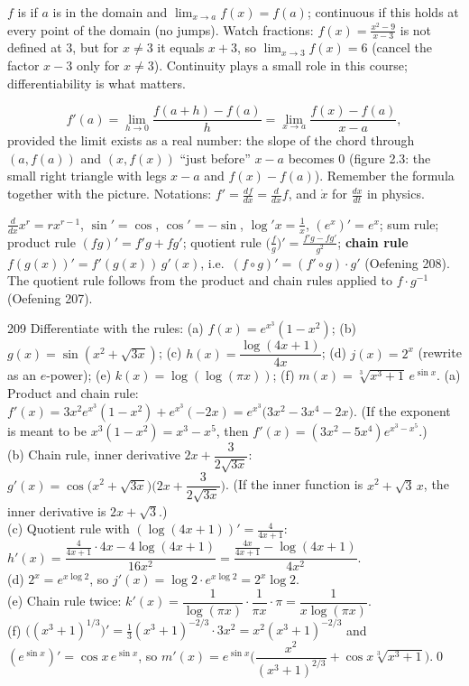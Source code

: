 \begin{key}
$f$ is  if $a$ is in the domain and $\lim_{x\to a}f(x)=f(a)$; continuous if this holds at every point of the domain (no jumps). Watch fractions: $f(x)=\frac{x^2-9}{x-3}$ is not defined at $3$, but for $x\ne3$ it equals $x+3$, so $\lim_{x\to3}f(x)=6$ (cancel the factor $x-3$ only for $x\ne3$). Continuity plays a small role in this course; differentiability is what matters.
\end{key}

\begin{key}
\[
f'(a)=\lim_{h\to0}\frac{f(a+h)-f(a)}h=\lim_{x\to a}\frac{f(x)-f(a)}{x-a},
\]
provided the limit exists as a real number: the slope of the chord through $(a,f(a))$ and $(x,f(x))$ ``just before'' $x-a$ becomes $0$ (figure 2.3: the small right triangle with legs $x-a$ and $f(x)-f(a)$). Remember the formula together with the picture. Notations: $f'=\frac{df}{dx}=\frac d{dx}f$, and $\dot x$ for $\frac{dx}{dt}$ in physics.
\end{key}
\begin{result}
$\frac d{dx}x^r=rx^{r-1}$, $\sin'=\cos$, $\cos'=-\sin$, $\log'x=\frac1x$, $(e^x)'=e^x$; sum rule; product rule $(fg)'=f'g+fg'$; quotient rule $\big(\frac fg\big)'=\frac{f'g-fg'}{g^2}$; \textbf{chain rule} $f(g(x))'=f'(g(x))\,g'(x)$, i.e.\ $(f\circ g)'=(f'\circ g)\cdot g'$ (Oefening 208). The quotient rule follows from the product and chain rules applied to $f\cdot g^{-1}$ (Oefening 207).
\end{result}

\begin{bookex}{209}
Differentiate with the rules: (a) $f(x)=e^{x^3}(1-x^2)$; (b) $g(x)=\sin(x^2+\sqrt{3x})$; (c) $h(x)=\dfrac{\log(4x+1)}{4x}$; (d) $j(x)=2^x$ (rewrite as an $e$-power); (e) $k(x)=\log(\log(\pi x))$; (f) $m(x)=\sqrt[3]{x^3+1}\,e^{\sin x}$.
\solution
(a) Product and chain rule: $f'(x)=3x^2e^{x^3}(1-x^2)+e^{x^3}(-2x)=e^{x^3}\big(3x^2-3x^4-2x\big)$. (If the exponent is meant to be $x^3(1-x^2)=x^3-x^5$, then $f'(x)=(3x^2-5x^4)e^{x^3-x^5}$.)\\
(b) Chain rule, inner derivative $2x+\dfrac3{2\sqrt{3x}}$: $g'(x)=\cos\big(x^2+\sqrt{3x}\big)\Big(2x+\dfrac3{2\sqrt{3x}}\Big)$. (If the inner function is $x^2+\sqrt3\,x$, the inner derivative is $2x+\sqrt3$.)\\
(c) Quotient rule with $(\log(4x+1))'=\frac4{4x+1}$: $h'(x)=\dfrac{\frac4{4x+1}\cdot4x-4\log(4x+1)}{16x^2}=\dfrac{\frac{4x}{4x+1}-\log(4x+1)}{4x^2}$.\\
(d) $2^x=e^{x\log2}$, so $j'(x)=\log2\cdot e^{x\log2}=2^x\log2$.\\
(e) Chain rule twice: $k'(x)=\dfrac1{\log(\pi x)}\cdot\dfrac1{\pi x}\cdot\pi=\dfrac1{x\log(\pi x)}$.\\
(f) $\big((x^3+1)^{1/3}\big)'=\frac13(x^3+1)^{-2/3}\cdot3x^2=x^2(x^3+1)^{-2/3}$ and $(e^{\sin x})'=\cos x\,e^{\sin x}$, so $m'(x)=e^{\sin x}\Big(\dfrac{x^2}{(x^3+1)^{2/3}}+\cos x\sqrt[3]{x^3+1}\Big)$.\qed
\end{bookex}

